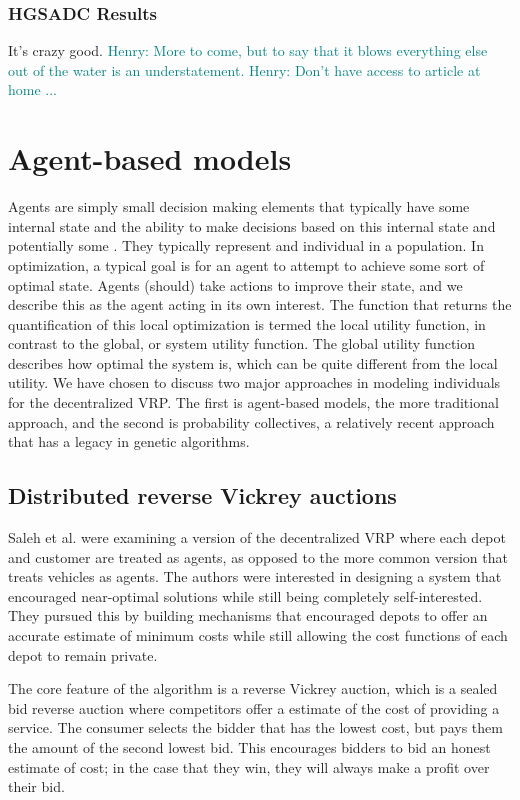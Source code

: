 \documentclass{sig-alternate}
\newcommand{\allcomments}[1]{{#1}}
\newcommand{\hfcomment}[1]{\textcolor{Teal}{\allcomments{Henry: {#1}}}}
\begin{document}
\subsubsection{HGSADC Results} 
 It's crazy good. \hfcomment{More to come, but to say that it blows everything else out of the water is an understatement.}
 \hfcomment{Don't have access to article at home ...}
\section{Agent-based models}
Agents are simply small decision making elements that typically have some internal state and the ability to make decisions based on this internal state and potentially some . They typically represent and individual in a population. In optimization, a typical goal is for an agent to attempt to achieve some sort of optimal state. Agents (should) take actions to improve their state, and we describe this as the agent acting in its own interest. The function that returns the quantification of this local optimization is termed the local utility function, in contrast to the global, or system utility function. The global utility function describes how optimal the system is, which can be quite different from the local utility.
We have chosen to discuss two major approaches in modeling individuals for the decentralized VRP. The first is agent-based models, the more traditional approach, and the second is probability collectives, a relatively recent approach that has a legacy in genetic algorithms.

\subsection{Distributed reverse Vickrey auctions}

Saleh et al.\cite{Saleh:2012} were examining a version of the decentralized VRP where each depot and customer are treated as agents, as opposed to the more common version that treats vehicles as agents. The authors were interested in designing a system that encouraged near-optimal solutions while still being completely self-interested. They pursued this by building mechanisms that encouraged depots to offer an accurate estimate of minimum costs while still allowing the cost functions of each depot to remain private. 

The core feature of the algorithm is a reverse Vickrey auction, which is a sealed bid reverse auction where competitors offer a estimate of the cost of providing a service. The consumer selects the bidder that has the lowest cost, but pays them the amount of the second lowest bid. This encourages bidders to bid an honest estimate of cost; in the case that they win, they will always make a profit over their bid.
\end{document}
